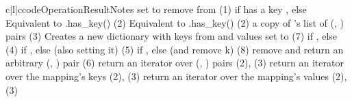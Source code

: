 \begin{tableiii}{c|l|c}{code}{Operation}{Result}{Notes}
          {set  to }
          {}
          {remove  from }
          {(1)}
          { if  has a key , else }
          {}
          {Equivalent to .has_key()}
          {(2)}
          {Equivalent to  .has_key()}
          {(2)}
          {a copy of 's list of (, ) pairs}
          {(3)}
          {}
          {}
          {Creates a new dictionary with keys from  and values set to }
          {(7)}			   
          { if ,
           else }
          {(4)}
          { if ,
           else  (also setting it)}
          {(5)}
          { if ,
           else  (and remove k)}
          {(8)}
          {remove and return an arbitrary (, ) pair}
          {(6)}
          {return an iterator over (, ) pairs}
          {(2), (3)}
          {return an iterator over the mapping's keys}
          {(2), (3)}
          {return an iterator over the mapping's values}
          {(2), (3)}
\end{tableiii}

